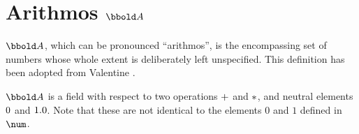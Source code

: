 \documentclass[12pt]{article}
\begin{document}
\section{Arithmos $\arithmos$}
\label{sec:arithmos}

$\arithmos$, which can be pronounced “arithmos”, is the encompassing
set of numbers whose whole extent is deliberately left
unspecified. This definition has been adopted from Valentine
\cite{Valentine2012}.

\begin{zed}
  [\arithmos] 
\end{zed}

$\arithmos$ is a field with respect to two operations $+$ and
$*$, and neutral elements $0$ and $1.0$. Note that these
are not identical to the elements $0$ and $1$ defined in $\num$.
\end{document}
